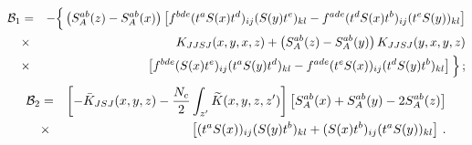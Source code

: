 \documentclass[11pt,a4paper]{article}
\begin{document}
\begin{eqnarray}
{\cal B}_1&=& 
- \Big\{\left(S_{A}^{ab}(z)-S_{A}^{ab}(x)\right)\left[f^{bde}(t^{a}S(x)t^{d})_{ij}(S(y)t^{e})_{kl}-f^{ade}(t^{d}S(x)t^{b})_{ij}(t^{e}S(y))_{kl}\right]\nonumber \\
&\times& K_{JJSJ}(x,y,x,z)+\left(S_{A}^{ab}(z)-S_{A}^{ab}(y)\right)K_{JJSJ}(y,x,y,z)\nonumber \\
&\times& \left[f^{bde}(S(x)t^{e})_{ij}(t^{a}S(y)t^{d})_{kl}-f^{ade}(t^{e}S(x))_{ij}(t^{d}S(y)t^{b})_{kl}\right]
\Big\}\,;
\end{eqnarray}
\begin{eqnarray}
{\cal B}_2&=& 
\left[- \bar K_{JSJ}(x,y,z)-\frac{N_{c}}{2}\int_{z^{\prime}}\widetilde{K}(x,y,z,z^{\prime})\right]\left[S_{A}^{ab}(x)+S_{A}^{ab}(y)-2S_{A}^{ab}(z)\right]\nonumber \\
&\times&\left[(t^{a}S(x))_{ij}(S(y)t^{b})_{kl}+(S(x)t^{b})_{ij}(t^{a}S(y))_{kl}\right]\,.
\end{eqnarray}
\end{document}
